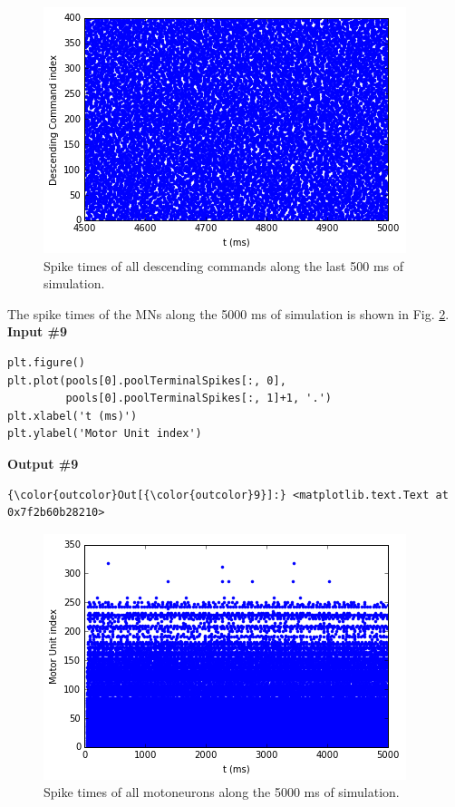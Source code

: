 \documentclass{article}
\makeatletter
\def\maxwidth{\ifdim\Gin@nat@width>\linewidth\linewidth
    \else\Gin@nat@width\fi}
\let\Oldincludegraphics\includegraphics
\renewcommand{\includegraphics}[1]{\Oldincludegraphics[width=.8\maxwidth]{#1}}
\makeatother
\begin{document}
    \begin{figure}
        \begin{center}
        \includegraphics{MNPoolWithDescendingCommand_files/MNPoolWithDescendingCommand_10_1.png}
        \end{center}
        \caption{Spike times of all descending commands along the last 500 ms of simulation.}
        \label{fig:spikesDescMNLast}
    \end{figure}
    
    The spike times of the MNs along the 5000 ms of simulation is shown in
Fig. \ref{fig:spikesMNMN}.
\newline\textbf{Input \#{}9}\begin{verbatim}
plt.figure()
plt.plot(pools[0].poolTerminalSpikes[:, 0],
         pools[0].poolTerminalSpikes[:, 1]+1, '.')
plt.xlabel('t (ms)')
plt.ylabel('Motor Unit index')
\end{verbatim}\textbf{Output \#{}9}
            \begin{Verbatim}[commandchars=\\\{\}]
{\color{outcolor}Out[{\color{outcolor}9}]:} <matplotlib.text.Text at 0x7f2b60b28210>
\end{Verbatim}
        
    \begin{figure}
        \begin{center}
        \includegraphics{MNPoolWithDescendingCommand_files/MNPoolWithDescendingCommand_12_1.png}
        \end{center}
        \caption{Spike times of all motoneurons along the 5000 ms of simulation.}
        \label{fig:spikesMNMN}
    \end{figure}
    
\end{document}
